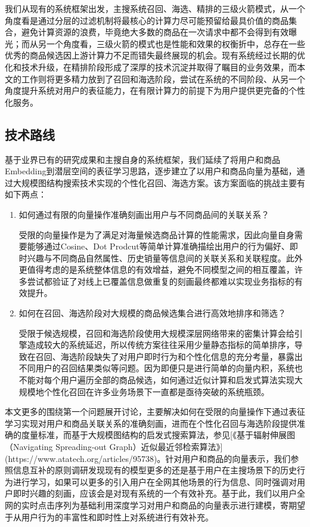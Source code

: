 \par 我们从现有的系统框架出发，主搜系统召回、海选、精排的三级火箭模式，从一个角度看是通过分层的过滤机制将最核心的计算力尽可能预留给最具价值的商品集合，避免计算资源的浪费，毕竟绝大多数的商品在一次请求中都不会得到有效曝光；而从另一个角度看，三级火箭的模式也是性能和效果的权衡折中，总存在一些优秀的商品候选因上游计算力不足而错失最终展现的机会。现有系统经过长期的优化和技术升级，在精排阶段形成了深厚的技术沉淀并取得了瞩目的业务效果，而本文的工作则将更多精力放到了召回和海选阶段，尝试在系统的不同阶段、从另一个角度提升系统对用户的表征能力，在有限计算力的前提下为用户提供更完备的个性化服务。

\subsection{技术路线}

基于业界已有的研究成果和主搜自身的系统框架，我们延续了将用户和商品Embedding到潜层空间的表征学习思路，逐步建立了以用户和商品向量为基础，通过大规模图结构搜索技术实现的个性化召回、海选方案。该方案面临的挑战主要有如下两点：
\begin{enumerate}
\item 如何通过有限的向量操作准确刻画出用户与不同商品间的关联关系？
\par 受限的向量操作是为了满足对海量候选商品计算的性能需求，因此向量自身需要能够通过Cosine、Dot Prodcut等简单计算准确描绘出用户的行为偏好、即时兴趣与不同商品自然属性、历史销量等信息间的关联关系和关联程度。此外更值得考虑的是系统整体信息的有效增益，避免不同模型之间的相互覆盖，许多尝试都验证了对线上已覆盖信息做重复的刻画最终都难以实现业务指标的有效提升。
\item 如何在召回、海选阶段对大规模的商品候选集合进行高效地排序和筛选？
\par 受限于候选规模，召回和海选阶段使用大规模深层网络带来的密集计算会给引擎造成较大的系统延迟，所以传统方案往往采用少量静态指标的简单排序，导致在召回、海选阶段缺失了对用户即时行为和个性化信息的充分考量，暴露出不同用户的召回结果类似等问题。因为即便只是进行简单的向量内积，系统也不能对每个用户遍历全部的商品候选，如何通过近似计算和启发式算法实现大规模地个性化召回在许多业务场景下一直都是亟待突破的系统瓶颈。
\end{enumerate}
\par 本文更多的围绕第一个问题展开讨论，主要解决如何在受限的向量操作下通过表征学习实现对用户和商品关联关系的准确刻画，进而在个性化召回与海选阶段提供准确的度量标准，而基于大规模图结构的启发式搜索算法，参见[《基于辐射伸展图（Navigating Spreading-out Graph）近似最近邻检索算法》](https://www.atatech.org/articles/95738)。针对用户和商品的向量表示，我们参照信息互补的原则调研发现现有的模型更多的还是基于用户在主搜场景下的历史行为进行学习，如果可以更多的引入用户在全网其他场景的行为信息、同时强调对用户即时兴趣的刻画，应该会是对现有系统的一个有效补充。基于此，我们以用户全网的实时点击序列为基础利用深度学习对用户和商品的向量表示进行建模，寄期望于从用户行为的丰富性和即时性上对系统进行有效补充。

